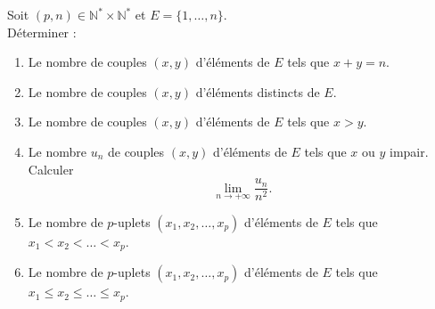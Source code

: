 \documentclass[../PolyS4.tex]{subfiles}
\begin{document}
Soit \( (p, n) \in \mathbb{N}^* \times \mathbb{N}^* \) et \( E = \{1, \ldots, n\} \).\\
 Déterminer :
\begin{enumerate}
    \item Le nombre de couples \( (x, y) \) d'éléments de \( E \) tels que \( x + y = n \).
    \item Le nombre de couples \( (x, y) \) d'éléments distincts de \( E \).
    \item Le nombre de couples \( (x, y) \) d'éléments de \( E \) tels que \( x > y \).
    \item Le nombre \( u_n \) de couples \( (x, y) \) d'éléments de \( E \) tels que \( x \) ou \( y \) impair. Calculer 
    \[
    \lim_{n \to +\infty} \frac{u_n}{n^2}.
    \]
    \item Le nombre de \( p \)-uplets \( (x_1, x_2, \ldots, x_p) \) d'éléments de \( E \) tels que \( x_1 < x_2 < \ldots < x_p \).
    \item Le nombre de \( p \)-uplets \( (x_1, x_2, \ldots, x_p) \) d'éléments de \( E \) tels que \( x_1 \leq x_2 \leq \ldots \leq x_p \).\\
\end{enumerate}







\end{document}
